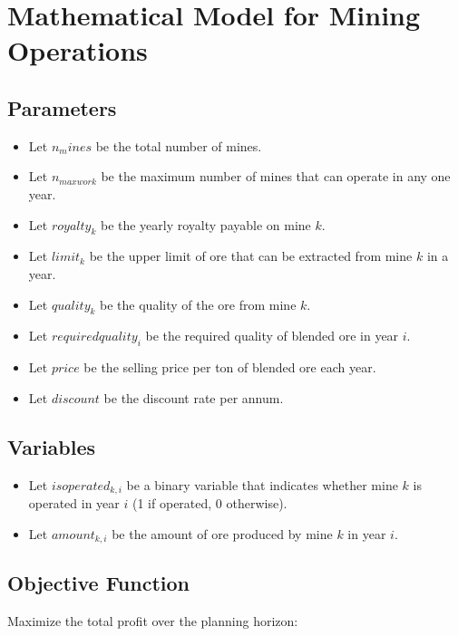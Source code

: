 \documentclass{article}
\begin{document}
\section*{Mathematical Model for Mining Operations}

\subsection*{Parameters}

\begin{itemize}
    \item Let \( n_mines \) be the total number of mines.
    \item Let \( n_{maxwork} \) be the maximum number of mines that can operate in any one year.
    \item Let \( royalty_k \) be the yearly royalty payable on mine \( k \).
    \item Let \( limit_k \) be the upper limit of ore that can be extracted from mine \( k \) in a year.
    \item Let \( quality_k \) be the quality of the ore from mine \( k \).
    \item Let \( requiredquality_i \) be the required quality of blended ore in year \( i \).
    \item Let \( price \) be the selling price per ton of blended ore each year.
    \item Let \( discount \) be the discount rate per annum.
\end{itemize}

\subsection*{Variables}

\begin{itemize}
    \item Let \( isoperated_{k,i} \) be a binary variable that indicates whether mine \( k \) is operated in year \( i \) (1 if operated, 0 otherwise).
    \item Let \( amount_{k,i} \) be the amount of ore produced by mine \( k \) in year \( i \).
\end{itemize}

\subsection*{Objective Function}

Maximize the total profit over the planning horizon:
\end{document}
